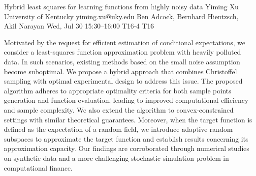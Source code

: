 \documentclass[12pt,lettersize,oneside]{book} %
\begin{document}
\begin{talk}
  {Hybrid least squares for learning functions from highly noisy data}%
  {Yiming Xu}%
  {University of Kentucky}%
  {yiming.xu@uky.edu}%
  {Ben Adcock, Bernhard Hientzsch, Akil Narayan}%
  {}%
  {Wed, Jul 30 15:30--16:00}%
  {T16-4}%
  {T16}%
  
    
   
Motivated by the request for efficient estimation of conditional expectations, we consider a least-squares function approximation problem with heavily polluted data. In such scenarios, existing methods based on the small noise assumption become suboptimal. We propose a hybrid approach that combines Christoffel sampling with optimal experimental design to address this issue. The proposed algorithm adheres to appropriate optimality criteria for both sample points generation and function evaluation, leading to improved computational efficiency and sample complexity. We also extend the algorithm to convex-constrained settings with similar theoretical guarantees. Moreover, when the target function is defined as the expectation of a random field, we introduce adaptive random subspaces to approximate the target function and establish results concerning its approximation capacity. Our findings are corroborated through numerical studies on synthetic data and a more challenging stochastic simulation problem in computational finance.
\medskip

\end{talk}




\end{document}
